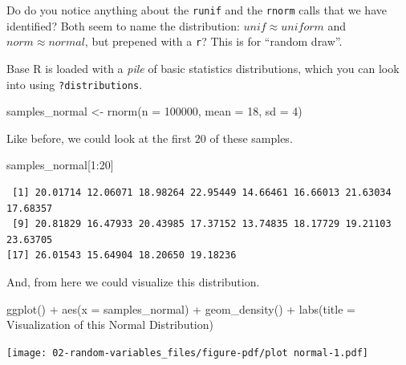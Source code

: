 \documentclass[
  letterpaper,
  DIV=11,
  numbers=noendperiod]{scrreprt}
\newenvironment{Shaded}{\begin{snugshade}}{\end{snugshade}}
\newcommand{\AttributeTok}[1]{\textcolor[rgb]{0.40,0.45,0.13}{#1}}
\newcommand{\DecValTok}[1]{\textcolor[rgb]{0.68,0.00,0.00}{#1}}
\newcommand{\FunctionTok}[1]{\textcolor[rgb]{0.28,0.35,0.67}{#1}}
\newcommand{\NormalTok}[1]{\textcolor[rgb]{0.00,0.23,0.31}{#1}}
\newcommand{\OtherTok}[1]{\textcolor[rgb]{0.00,0.23,0.31}{#1}}
\newcommand{\SpecialCharTok}[1]{\textcolor[rgb]{0.37,0.37,0.37}{#1}}
\newcommand{\StringTok}[1]{\textcolor[rgb]{0.13,0.47,0.30}{#1}}
\begin{document}
Do do you notice anything about the \texttt{runif} and the
\texttt{rnorm} calls that we have identified? Both seem to name the
distribution: \(unif \approx uniform\) and \(norm \approx normal\), but
prepened with a \texttt{r}? This is for ``random draw''.

Base R is loaded with a \emph{pile} of basic statistics distributions,
which you can look into using \texttt{?distributions}.

\begin{Shaded}
\begin{Highlighting}[]
\NormalTok{samples\_normal }\OtherTok{\textless{}{-}} \FunctionTok{rnorm}\NormalTok{(}\AttributeTok{n =} \DecValTok{100000}\NormalTok{, }\AttributeTok{mean =} \DecValTok{18}\NormalTok{, }\AttributeTok{sd =} \DecValTok{4}\NormalTok{)}
\end{Highlighting}
\end{Shaded}

Like before, we could look at the first \(20\) of these samples.

\begin{Shaded}
\begin{Highlighting}[]
\NormalTok{samples\_normal[}\DecValTok{1}\SpecialCharTok{:}\DecValTok{20}\NormalTok{]}
\end{Highlighting}
\end{Shaded}

\begin{verbatim}
 [1] 20.01714 12.06071 18.98264 22.95449 14.66461 16.66013 21.63034 17.68357
 [9] 20.81829 16.47933 20.43985 17.37152 13.74835 18.17729 19.21103 23.63705
[17] 26.01543 15.64904 18.20650 19.18236
\end{verbatim}

And, from here we could visualize this distribution.

\begin{Shaded}
\begin{Highlighting}[]
\FunctionTok{ggplot}\NormalTok{() }\SpecialCharTok{+} 
  \FunctionTok{aes}\NormalTok{(}\AttributeTok{x =}\NormalTok{ samples\_normal) }\SpecialCharTok{+} 
  \FunctionTok{geom\_density}\NormalTok{() }\SpecialCharTok{+} 
  \FunctionTok{labs}\NormalTok{(}\AttributeTok{title =} \StringTok{\textquotesingle{}Visualization of this Normal Distribution\textquotesingle{}}\NormalTok{)}
\end{Highlighting}
\end{Shaded}

\texttt{[image: 02-random-variables\_files/figure-pdf/plot normal-1.pdf]}
\end{document}
